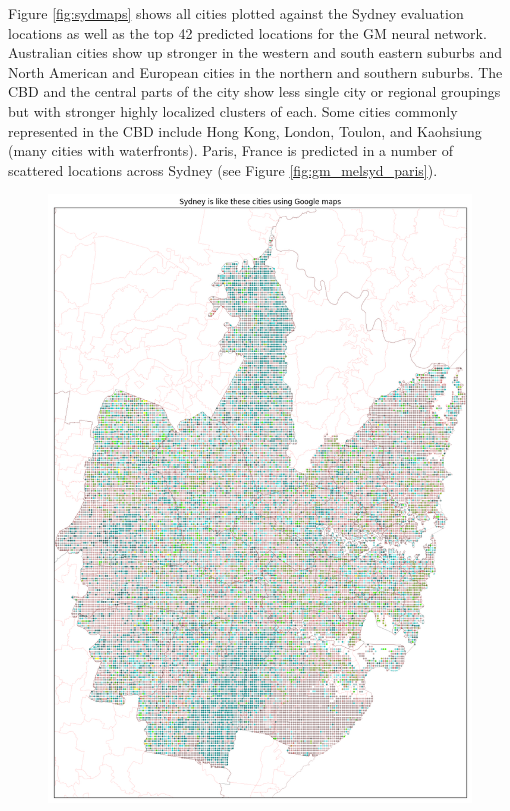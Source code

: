 \documentclass[sageh,times]{sagej}
\begin{document}
Figure \ref{fig:sydmaps} shows all cities plotted against the Sydney evaluation locations as well as the top 42 predicted locations for the GM neural network. Australian cities show up stronger in the western and south eastern suburbs and North American and European cities in the northern and southern suburbs. The CBD and the central parts of the city show less single city or regional groupings but with stronger highly localized clusters of each. Some cities commonly represented in the CBD include Hong Kong, London, Toulon, and Kaohsiung (many cities with waterfronts). Paris, France is predicted in a number of scattered locations across Sydney (see Figure \ref{fig:gm_melsyd_paris}).

\begin{figure}[!htbp]
\centering    
\includegraphics[scale=0.20]{Images/SydneyOverall_maps.png} 

\end{figure}
\end{document}
